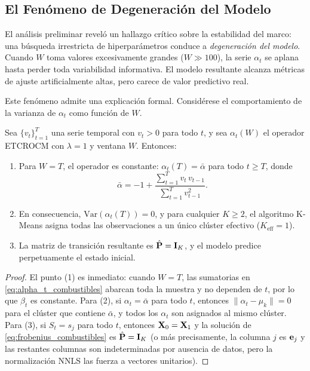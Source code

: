 \subsection{El Fenómeno de Degeneración del Modelo}
\label{subsec:degeneracion}

El análisis preliminar reveló un hallazgo crítico sobre la
estabilidad del marco: una búsqueda irrestricta de hiperparámetros
conduce a \emph{degeneración del modelo}.  Cuando $W$ toma valores
excesivamente grandes ($W \gg 100$), la serie $\alpha_t$ se aplana
hasta perder toda variabilidad informativa.  El modelo resultante
alcanza métricas de ajuste artificialmente altas, pero carece de
valor predictivo real.

Este fenómeno admite una explicación formal.  Considérese el
comportamiento de la varianza de $\alpha_t$ como función de $W$.

\begin{theorem}
\label{prop:degeneracion}
Sea $\{v_t\}_{t=1}^{T}$ una serie temporal con $v_t > 0$ para
todo $t$, y sea $\alpha_t(W)$ el operador ETCROCM con
$\lambda = 1$ y ventana $W$.  Entonces:
\begin{enumerate}
    \item Para $W = T$, el operador es constante:
    $\alpha_t(T) = \bar{\alpha}$ para todo $t \ge T$, donde
    \begin{equation}
        \bar{\alpha} = -1 + \frac{\sum_{t=1}^{T} v_t\,v_{t-1}}
        {\sum_{t=1}^{T} v_{t-1}^2}.
    \end{equation}
    \item En consecuencia, $\mathrm{Var}(\alpha_t(T)) = 0$, y
    para cualquier $K \ge 2$, el algoritmo K-Means asigna todas
    las observaciones a un único clúster efectivo
    ($K_{\mathrm{eff}} = 1$).
    \item La matriz de transición resultante es
    $\hat{\mathbf{P}} = \mathbf{I}_K$, y el modelo predice
    perpetuamente el estado inicial.
\end{enumerate}
\end{theorem}

\begin{proof}
El punto (1) es inmediato: cuando $W = T$, las sumatorias en
\eqref{eq:alpha_t_combustibles} abarcan toda la muestra y no
dependen de $t$, por lo que $\beta_t$ es constante.  Para (2),
si $\alpha_t = \bar{\alpha}$ para todo $t$, entonces
$\|\alpha_t - \mu_k\| = 0$ para el clúster que contiene
$\bar{\alpha}$, y todos los $\alpha_t$ son asignados al mismo
clúster.  Para (3), si $S_t = s_j$ para todo $t$, entonces
$\mathbf{X}_0 = \mathbf{X}_1$ y la solución de
\eqref{eq:frobenius_combustibles} es $\hat{\mathbf{P}} = \mathbf{I}_K$
(o más precisamente, la columna $j$ es $\mathbf{e}_j$ y las
restantes columnas son indeterminadas por ausencia de datos,
pero la normalización NNLS las fuerza a vectores unitarios).
\end{proof}

